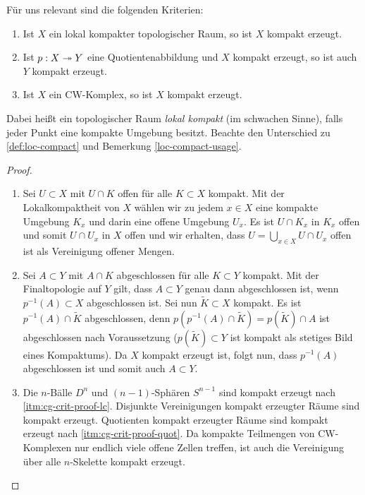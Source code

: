 Für uns relevant sind die folgenden Kriterien:
\begin{lemma} \label{cg-crit}
  \begin{enumerate}[label=(\roman*)]
    \item \label{itm:cg-crit-lc} Ist $X$ ein lokal kompakter
      topologischer Raum, so ist $X$ kompakt erzeugt.
    \item \label{itm:cg-crit-quot} Ist $p: X \twoheadrightarrow Y$ eine
      Quotientenabbildung und $X$ kompakt erzeugt, so ist auch $Y$
      kompakt erzeugt.
     \item \label{itm:cg-crit-cw} Ist $X$ ein CW-Komplex, so ist $X$
       kompakt erzeugt.
  \end{enumerate}
\end{lemma}
Dabei heißt ein topologischer Raum \emph{lokal kompakt} (im schwachen
Sinne), falls jeder Punkt eine kompakte Umgebung besitzt. Beachte den
Unterschied zu \ref{def:loc-compact} und Bemerkung
\ref{loc-compact-usage}.
\begin{proof}
  \begin{enumerate}[label=(\roman*)]
    \item \label{itm:cg-crit-proof-lc} Sei $U \subset X$ mit $U \cap
      K$ offen für alle $K \subset X$ kompakt. Mit der
      Lokalkompaktheit von $X$ wählen wir zu jedem $x \in X$ eine
      kompakte Umgebung $K_x$ und darin eine offene Umgebung $U_x$. Es
      ist $U \cap K_x$ in $K_x$ offen und somit $U \cap U_x$ in $X$
      offen und wir erhalten, dass $U = \bigcup_{x \in X} U \cap U_x$
      offen ist als Vereinigung offener Mengen.
    \item \label{itm:cg-crit-proof-quot} Sei $A \subset Y$ mit $A \cap
      K$ abgeschlossen für alle $K \subset Y$ kompakt. Mit der
      Finaltopologie auf $Y$ gilt, dass $A \subset Y$ genau dann
      abgeschlossen ist, wenn $p^{-1}(A) \subset X$ abgeschlossen
      ist. Sei nun $\tilde{K} \subset X$ kompakt. Es ist $p^{-1}(A)
      \cap \tilde{K}$ abgeschlossen, denn $p(p^{-1}(A) \cap \tilde{K})
      = p(\tilde{K}) \cap A$ ist abgeschlossen nach Voraussetzung
      ($p(\tilde{K}) \subset Y$ ist kompakt als stetiges Bild eines
      Kompaktums). Da $X$ kompakt erzeugt ist, folgt nun, dass
      $p^{-1}(A)$ abgeschlossen ist und somit auch $A \subset Y$.
    \item Die $n$-Bälle $D^n$ und $(n-1)$-Sphären $S^{n-1}$ sind
      kompakt erzeugt nach \ref{itm:cg-crit-proof-lc}. Disjunkte
      Vereinigungen kompakt erzeugter Räume sind kompakt
      erzeugt. Quotienten kompakt erzeugter Räume sind kompakt erzeugt
      nach \ref{itm:cg-crit-proof-quot}. Da kompakte Teilmengen von
      CW-Komplexen nur endlich viele offene Zellen treffen, ist auch
      die Vereinigung über alle $n$-Skelette kompakt erzeugt.
  \end{enumerate}
\end{proof}

